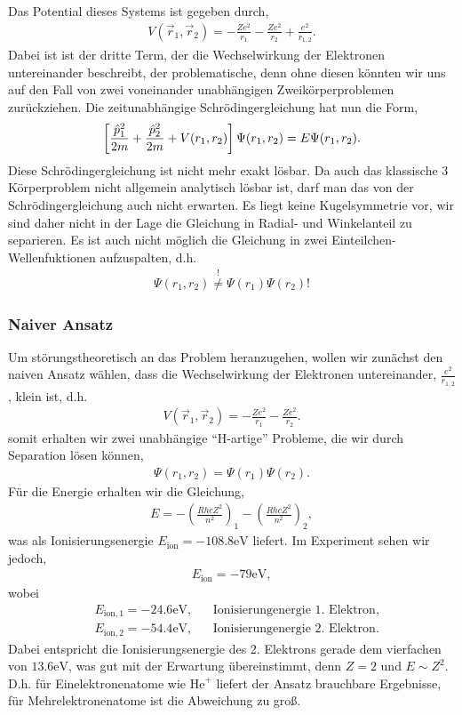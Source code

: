  Das Potential dieses Systems ist gegeben durch,
\begin{align*}
V(\vec{r}_1,\vec{r}_2) = -\frac{Ze^2}{r_1} - \frac{Ze^2}{r_2} +
\frac{e^2}{r_{1,2}}.
\end{align*} 
Dabei ist ist der dritte Term, der die Wechselwirkung der Elektronen
untereinander beschreibt, der problematische, denn ohne diesen könnten wir uns
auf den Fall von zwei voneinander unabhängigen Zweikörperproblemen
zurückziehen. Die zeitunabhängige Schrödingergleichung hat nun die Form,
\begin{align*}
\left[\frac{\hat{\boldmath{p}}_1^2}{2m} + \frac{\hat{\boldmath{p}}_2^2}{2m} + V(r_1,r_2)
\right]\Psi(r_1,r_2) = E\Psi(r_1,r_2).
\end{align*}
Diese Schrödingergleichung ist nicht mehr exakt lösbar. Da auch das klassische
3 Körperproblem nicht allgemein analytisch lösbar ist, darf man das von der
Schrödingergleichung auch nicht erwarten. Es liegt keine Kugelsymmetrie vor, wir
sind daher nicht in der Lage die Gleichung in Radial- und Winkelanteil zu separieren. Es ist auch nicht möglich die Gleichung in zwei Einteilchen-Wellenfuktionen aufzuspalten, d.h.
\begin{align*}
\Psi(r_1,r_2) \overset{!}{\neq} \Psi(r_1)\Psi(r_2)!
\end{align*}

\subsubsection{Naiver Ansatz}

Um störungstheoretisch an das Problem heranzugehen, 
wollen wir zunächst den naiven Ansatz wählen, dass die Wechselwirkung der
Elektronen untereinander, $\frac{e^2}{r_{1,2}}$, klein ist, d.h.
\begin{align*}
V(\vec{r}_1,\vec{r}_2) = -\frac{Ze^2}{r_1} - \frac{Ze^2}{r_2}.
\end{align*} 
somit erhalten wir  zwei unabhängige ``H-artige'' Probleme, die wir durch
Separation lösen können,
\begin{align*}
\Psi(r_1,r_2) = \Psi(r_1)\Psi(r_2).
\end{align*}
Für die Energie erhalten wir die Gleichung,
\begin{align*}
E = -\left(\frac{RhcZ^2}{n^2}\right)_1 - \left(\frac{RhcZ^2}{n^2}\right)_2,
\end{align*}
was als Ionisierungsenergie $E_{\text{ion}} = -108.8\mathrm{eV}$ liefert. Im
Experiment sehen wir jedoch,
\begin{align*}
E_{\text{ion}} = -79\mathrm{eV},
\end{align*}
wobei
\begin{align*}
&E_{\text{ion},1} = -24.6\mathrm{eV},&& \text{Ionisierungenergie 1. Elektron},\\
&E_{\text{ion},2} = -54.4\mathrm{eV},&& \text{Ionisierungenergie 2. Elektron}.
\end{align*}
Dabei entspricht die Ionisierungsenergie des 2. Elektrons gerade dem vierfachen
von $13.6\mathrm{eV}$, was gut mit der Erwartung übereinstimmt, denn $Z=2$ und
$E\sim Z^2$. D.h. für Einelektronenatome wie $\mathrm{He}^+$ liefert der Ansatz
brauchbare Ergebnisse, für Mehrelektronenatome ist die Abweichung zu groß.

